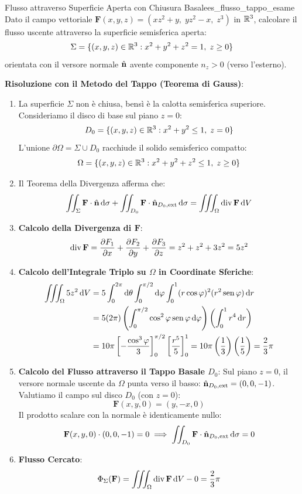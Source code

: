 \begin{esempio}{Flusso attraverso Superficie Aperta con Chiusura Basale}{es_flusso_tappo_esame}
Dato il campo vettoriale $\mathbf{F}(x,y,z) = (x z^2 + y, \; y z^2 - x, \; z^3)$ in $\mathbb{R}^3$, calcolare il flusso uscente attraverso la superficie semisferica aperta:
\[
\Sigma = \{(x,y,z) \in \mathbb{R}^3 : x^2 + y^2 + z^2 = 1, \; z \ge 0\}
\]
orientata con il versore normale $\hat{\mathbf{n}}$ avente componente $n_z > 0$ (verso l'esterno).

\medskip\noindent\textbf{Risoluzione con il Metodo del Tappo (Teorema di Gauss)}:
\begin{enumerate}
    \item La superficie $\Sigma$ non è chiusa, bensì è la calotta semisferica superiore.
    Consideriamo il disco di base sul piano $z = 0$:
    \[
    D_0 = \{(x,y,z) \in \mathbb{R}^3 : x^2 + y^2 \le 1, \; z = 0\}
    \]
    L'unione $\partial \Omega = \Sigma \cup D_0$ racchiude il solido semisferico compatto:
    \[
    \Omega = \{(x,y,z) \in \mathbb{R}^3 : x^2 + y^2 + z^2 \le 1, \; z \ge 0\}
    \]

    \item Il Teorema della Divergenza afferma che:
    \[
    \iint_\Sigma \mathbf{F} \cdot \hat{\mathbf{n}} \mathop{}\!\mathrm{d}\sigma + \iint_{D_0} \mathbf{F} \cdot \hat{\mathbf{n}}_{D_0, \text{ext}} \mathop{}\!\mathrm{d}\sigma = \iiint_\Omega \operatorname{div} \mathbf{F} \mathop{}\!\mathrm{d} V
    \]

    \item \textbf{Calcolo della Divergenza di $\mathbf{F}$}:
    \[
    \operatorname{div} \mathbf{F} = \frac{\partial F_1}{\partial x} + \frac{\partial F_2}{\partial y} + \frac{\partial F_3}{\partial z} = z^2 + z^2 + 3z^2 = 5z^2
    \]

    \item \textbf{Calcolo dell'Integrale Triplo su $\Omega$ in Coordinate Sferiche}:
    \begin{align*}
    \iiint_\Omega 5z^2 \mathop{}\!\mathrm{d} V &= 5 \int_{0}^{2\pi} \mathop{}\!\mathrm{d} \theta \int_{0}^{\pi/2} \mathop{}\!\mathrm{d} \varphi \int_{0}^{1} (r\cos\varphi)^2 (r^2\operatorname{sen}\varphi) \mathop{}\!\mathrm{d} r \\
    &= 5(2\pi) \left( \int_{0}^{\pi/2} \cos^2\varphi \operatorname{sen}\varphi \mathop{}\!\mathrm{d} \varphi \right) \left( \int_{0}^{1} r^4 \mathop{}\!\mathrm{d} r \right) \\
    &= 10\pi \left[ -\frac{\cos^3\varphi}{3} \right]_0^{\pi/2} \left[ \frac{r^5}{5} \right]_0^1 = 10\pi \left( \frac{1}{3} \right) \left( \frac{1}{5} \right) = \frac{2}{3}\pi
    \end{align*}

    \item \textbf{Calcolo del Flusso attraverso il Tappo Basale $D_0$}:
    Sul piano $z = 0$, il versore normale uscente da $\Omega$ punta verso il basso: $\hat{\mathbf{n}}_{D_0, \text{ext}} = (0, 0, -1)$.
    Valutiamo il campo sul disco $D_0$ (con $z = 0$):
    \[
    \mathbf{F}(x,y,0) = (y, -x, 0)
    \]
    Il prodotto scalare con la normale è identicamente nullo:
    \[
    \mathbf{F}(x,y,0) \cdot (0, 0, -1) = 0 \implies \iint_{D_0} \mathbf{F} \cdot \hat{\mathbf{n}}_{D_0, \text{ext}} \mathop{}\!\mathrm{d}\sigma = 0
    \]

    \item \textbf{Flusso Cercato}:
    \[
    \Phi_\Sigma(\mathbf{F}) = \iiint_\Omega \operatorname{div} \mathbf{F} \mathop{}\!\mathrm{d} V - 0 = \frac{2}{3}\pi
    \]
\end{enumerate}
\end{esempio}

